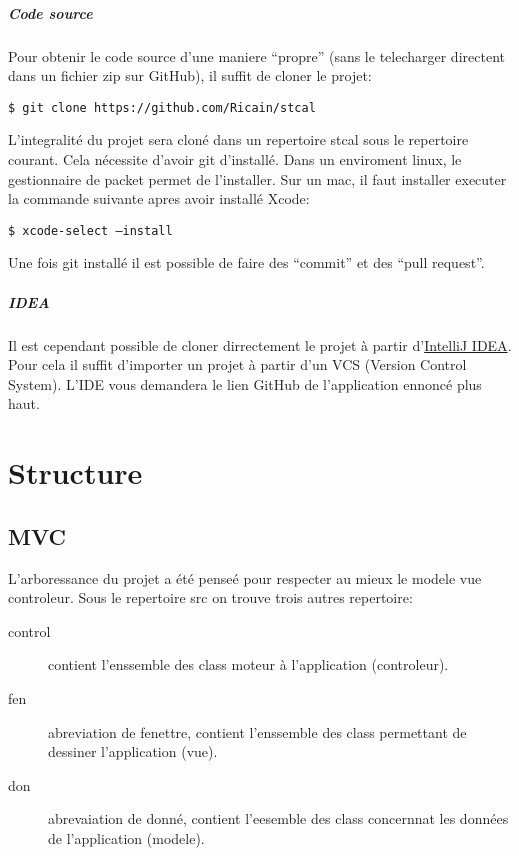 \documentclass[a4paper,10pt]{report}
\newcommand{\code}[1]{\texttt{#1}}
\begin{document}
	\paragraph[Code source]{Code source}
	Pour obtenir le code source d'une maniere ``propre'' (sans le telecharger directent dans un fichier zip sur GitHub), il suffit de cloner le projet:

	\code{\$ git clone https://github.com/Ricain/stcal}

	L'integralité du projet sera cloné dans un repertoire stcal sous le repertoire courant. Cela nécessite d'avoir git d'installé. Dans un enviroment linux, le gestionnaire de packet permet de l'installer. Sur un mac, il faut installer executer la commande suivante apres avoir installé Xcode:

	\code{\$ xcode-select --install}

	Une fois git installé il est possible de faire des ``commit'' et des ``pull request''.

	\paragraph[IDEA]{IDEA}
	Il est cependant possible de cloner dirrectement le projet à partir d'\href{http://www.jetbrains.com/idea/}{IntelliJ IDEA}. Pour cela il suffit d'importer un projet à partir d'un VCS (Version Control System). L'IDE vous demandera le lien GitHub de l'application ennoncé plus haut.

\chapter{Structure}

\section{MVC}

	L'arboressance du projet a été penseé pour respecter au mieux le modele vue controleur. Sous le repertoire src on trouve trois autres repertoire:
	\begin{description}
		\item[control] contient l'enssemble des class moteur à l'application (controleur).
		\item[fen] abreviation de fenettre, contient l'enssemble des class permettant de dessiner l'application (vue).
		\item[don] abrevaiation de donné, contient l'eesemble des class concernnat les données de l'application (modele).
	\end{description}
\end{document}
